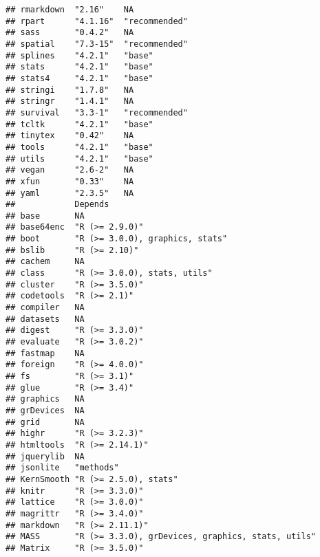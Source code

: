 \documentclass[
]{article}
\begin{document}
\begin{verbatim}
## rmarkdown  "2.16"    NA           
## rpart      "4.1.16"  "recommended"
## sass       "0.4.2"   NA           
## spatial    "7.3-15"  "recommended"
## splines    "4.2.1"   "base"       
## stats      "4.2.1"   "base"       
## stats4     "4.2.1"   "base"       
## stringi    "1.7.8"   NA           
## stringr    "1.4.1"   NA           
## survival   "3.3-1"   "recommended"
## tcltk      "4.2.1"   "base"       
## tinytex    "0.42"    NA           
## tools      "4.2.1"   "base"       
## utils      "4.2.1"   "base"       
## vegan      "2.6-2"   NA           
## xfun       "0.33"    NA           
## yaml       "2.3.5"   NA           
##            Depends                                          
## base       NA                                               
## base64enc  "R (>= 2.9.0)"                                   
## boot       "R (>= 3.0.0), graphics, stats"                  
## bslib      "R (>= 2.10)"                                    
## cachem     NA                                               
## class      "R (>= 3.0.0), stats, utils"                     
## cluster    "R (>= 3.5.0)"                                   
## codetools  "R (>= 2.1)"                                     
## compiler   NA                                               
## datasets   NA                                               
## digest     "R (>= 3.3.0)"                                   
## evaluate   "R (>= 3.0.2)"                                   
## fastmap    NA                                               
## foreign    "R (>= 4.0.0)"                                   
## fs         "R (>= 3.1)"                                     
## glue       "R (>= 3.4)"                                     
## graphics   NA                                               
## grDevices  NA                                               
## grid       NA                                               
## highr      "R (>= 3.2.3)"                                   
## htmltools  "R (>= 2.14.1)"                                  
## jquerylib  NA                                               
## jsonlite   "methods"                                        
## KernSmooth "R (>= 2.5.0), stats"                            
## knitr      "R (>= 3.3.0)"                                   
## lattice    "R (>= 3.0.0)"                                   
## magrittr   "R (>= 3.4.0)"                                   
## markdown   "R (>= 2.11.1)"                                  
## MASS       "R (>= 3.3.0), grDevices, graphics, stats, utils"
## Matrix     "R (>= 3.5.0)"                                   

\end{verbatim}
\end{document}
